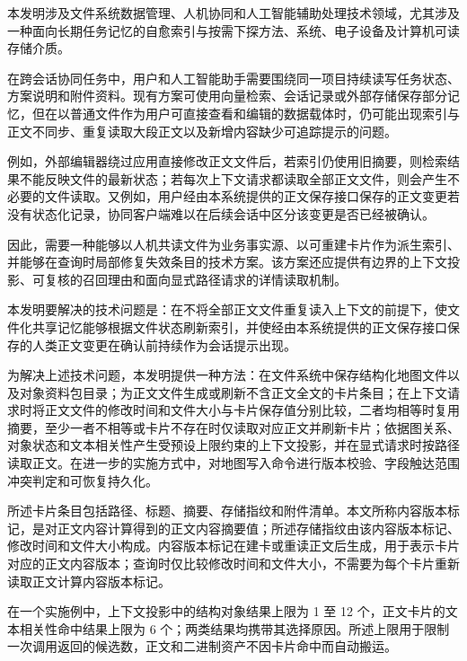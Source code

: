 \patentdocumenttitle{\inventiontitle}

 本发明涉及文件系统数据管理、人机协同和人工智能辅助处理技术领域，尤其涉及一种面向长期任务记忆的自愈索引与按需下探方法、系统、电子设备及计算机可读存储介质。

 在跨会话协同任务中，用户和人工智能助手需要围绕同一项目持续读写任务状态、方案说明和附件资料。现有方案可使用向量检索、会话记录或外部存储保存部分记忆，但在以普通文件作为用户可直接查看和编辑的数据载体时，仍可能出现索引与正文不同步、重复读取大段正文以及新增内容缺少可追踪提示的问题。

 例如，外部编辑器绕过应用直接修改正文文件后，若索引仍使用旧摘要，则检索结果不能反映文件的最新状态；若每次上下文请求都读取全部正文文件，则会产生不必要的文件读取。又例如，用户经由本系统提供的正文保存接口保存的正文变更若没有状态化记录，协同客户端难以在后续会话中区分该变更是否已经被确认。

 因此，需要一种能够以人机共读文件为业务事实源、以可重建卡片作为派生索引、并能够在查询时局部修复失效条目的技术方案。该方案还应提供有边界的上下文投影、可复核的召回理由和面向显式路径请求的详情读取机制。

 本发明要解决的技术问题是：在不将全部正文文件重复读入上下文的前提下，使文件化共享记忆能够根据文件状态刷新索引，并使经由本系统提供的正文保存接口保存的人类正文变更在确认前持续作为会话提示出现。

 为解决上述技术问题，本发明提供一种方法：在文件系统中保存结构化地图文件以及对象资料包目录；为正文文件生成或刷新不含正文全文的卡片条目；在上下文请求时将正文文件的修改时间和文件大小与卡片保存值分别比较，二者均相等时复用摘要，至少一者不相等或卡片不存在时仅读取对应正文并刷新卡片；依据图关系、对象状态和文本相关性产生受预设上限约束的上下文投影，并在显式请求时按路径读取正文。在进一步的实施方式中，对地图写入命令进行版本校验、字段触达范围冲突判定和可恢复持久化。

 所述卡片条目包括路径、标题、摘要、存储指纹和附件清单。本文所称内容版本标记，是对正文内容计算得到的正文内容摘要值；所述存储指纹由该内容版本标记、修改时间和文件大小构成。内容版本标记在建卡或重读正文后生成，用于表示卡片对应的正文内容版本；查询时仅比较修改时间和文件大小，不需要为每个卡片重新读取正文计算内容版本标记。

 在一个实施例中，上下文投影中的结构对象结果上限为 1 至 12 个，正文卡片的文本相关性命中结果上限为 6 个；两类结果均携带其选择原因。所述上限用于限制一次调用返回的候选数，正文和二进制资产不因卡片命中而自动搬运。

